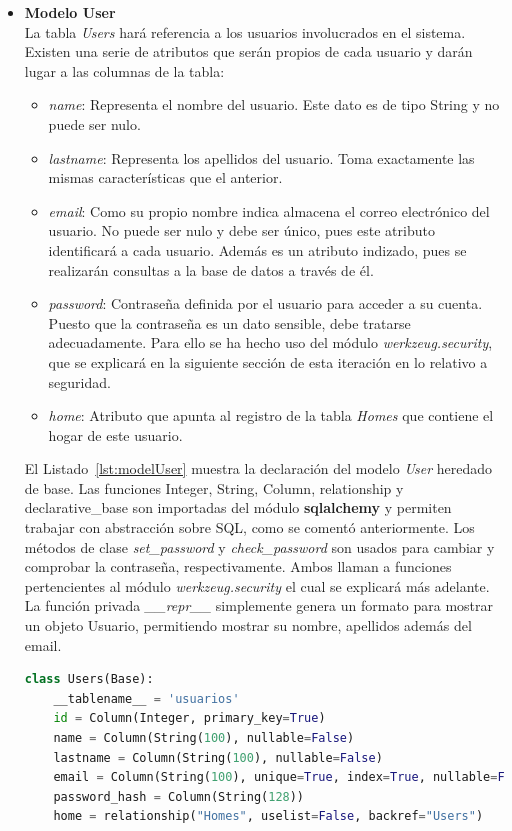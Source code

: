 \begin{itemize}
\item \textbf{Modelo User}\\
La tabla \textit{Users} hará referencia a los usuarios involucrados en el sistema. Existen una serie de atributos que serán propios de cada usuario y darán lugar a las columnas de la tabla:
\begin{itemize}
\item \textit{name}: Representa el nombre del usuario. Este dato es de tipo String y no puede ser nulo.
\item \textit{lastname}: Representa los apellidos del usuario. Toma exactamente las mismas características que el anterior.
\item \textit{email}: Como su propio nombre indica almacena el correo electrónico del usuario. No puede ser nulo y debe ser único, pues este atributo identificará a cada usuario. Además es un atributo indizado, pues se realizarán consultas a la base de datos a través de él.
\item \textit{password}: Contraseña definida por el usuario para acceder a su cuenta. Puesto que la contraseña es un dato sensible, debe tratarse adecuadamente. Para ello se ha hecho uso del módulo \textit{werkzeug.security}, que se explicará en la siguiente sección de esta iteración en lo relativo a seguridad.
\item \textit{home}: Atributo que apunta al registro de la tabla \textit{Homes} que contiene el hogar de este usuario.
\end{itemize}
El Listado~\ref{lst:modelUser} muestra la declaración del modelo \textit{User} heredado de base. Las funciones Integer, String, Column, relationship y declarative\_base son importadas del módulo \textbf{sqlalchemy} y permiten trabajar con abstracción sobre SQL, como se comentó anteriormente. Los métodos de clase \textit{set\_password} y \textit{check\_password} son usados para cambiar y comprobar la contraseña, respectivamente. Ambos llaman a funciones pertencientes al módulo \textit{werkzeug.security} el cual se explicará más adelante. La función privada \textit{\_\_repr\_\_} simplemente genera un formato para mostrar un objeto Usuario, permitiendo mostrar su nombre, apellidos además del email.
\begin{lstlisting}[language=Python,float=ht,caption={Modelo \textit{User}},label={lst:modelUser}]
class Users(Base):
    __tablename__ = 'usuarios'
    id = Column(Integer, primary_key=True)
    name = Column(String(100), nullable=False)
    lastname = Column(String(100), nullable=False)
    email = Column(String(100), unique=True, index=True, nullable=False)
    password_hash = Column(String(128))
    home = relationship("Homes", uselist=False, backref="Users")


\end{lstlisting}
\end{itemize}
